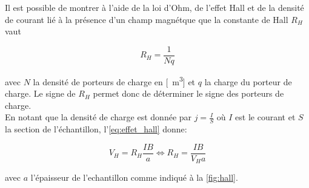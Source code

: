 
Il est possible de montrer à l'aide de la loi d'Ohm, de l'effet Hall et de la densité de courant lié à la présence d'un champ magnétque que la constante de Hall \(R_H\) vaut

\begin{equation}
    R_H = \frac{1}{Nq}
\end{equation}

avec \(N\) la densité de porteurs de charge en [\si{\per\meter\cubed}] et \(q\) la charge du porteur de charge. Le signe de \(R_H\) permet donc de déterminer le signe des porteurs de charge.\\
En notant que la densité de charge est donnée par \(j = \frac{I}{S}\) où \(I\) est le courant et \(S\) la section de l'échantillon, l'\autoref{eq:effet_hall} donne:

\begin{equation}
    V_H = R_H \frac{IB}{a} \iff R_H = \frac{IB}{V_Ha}
\end{equation}

avec \(a\) l'épaisseur de l'echantillon comme indiqué à la \autoref{fig:hall}.
